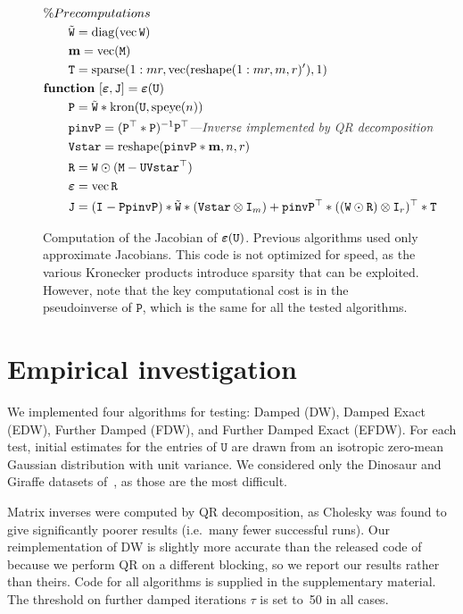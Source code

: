 \documentclass[runningheads]{llncs}
\def\tr{^\top}
\def\xcomment#1{\textcolor[gray]{.2}{\text{\em---#1}}}
\def\vec{\operatorname{vec}}
\def\hadamard{\odot}
\def\m#1{\ensuremath{\mathtt{#1}}}
\def\v#1{\ensuremath{\mathbf{#1}}}
\def\mU{\m U}
\def\mW{\m W}
\def\mM{\m M}
\def\twiddle#1{{\tilde{#1}}}
\def\tW{\twiddle\mW}
\begin{document}
\begin{figure}[t]
\begin{align*}
\MoveEqLeft\% Precomputations\\
&\tW = \operatorname{diag}(\vec \mW)\\
&\v m = \vec(\mM)\\
&\Ttrans = \operatorname{sparse}(1:mr, \vec(\operatorname{reshape}(1:mr, m, r)'), 1)\\
\MoveEqLeft\text{\bf function}~[\verru, \m J] = \verru(\m U)\\
&\m P = \tW * \text{kron}(\mU, \text{speye}(n))\\
&\m {pinvP} = (\m P\tr*\m P)^{-1} \m P\tr \xcomment{Inverse implemented by QR decomposition}\\
&\m {Vstar} = \operatorname{reshape}(\m {pinvP} * \v m, n, r)\\
&\m R = \mW\hadamard(\m M - \mU{\m{Vstar}}\tr)\\
&\verru = \vec{\m R}\\
&\m J = (\Id{} - \m P \m {pinvP})*\tW* (\kron{\m{Vstar}}{\Id m})  +
      \m {pinvP}\tr*(\kron{(\mW\hadamard\m R)}{\Id r})\tr*\Ttrans
\end{align*}
\caption{Computation of the Jacobian of $\verru(\mU)$.   Previous algorithms used only approximate Jacobians.  This code is not optimized for speed, as the various Kronecker products introduce sparsity that can be exploited.  However, note that the key computational cost is in the pseudoinverse of $\m P$, which is the same for all the tested algorithms.}
\label{fig:computeJ}
\end{figure}

\section{Empirical investigation}
We implemented four algorithms for testing: Damped (DW), Damped Exact (EDW), Further Damped (FDW), and Further Damped Exact (EFDW).   For each test, initial estimates for the entries of $\mU$ are drawn from an isotropic zero-mean Gaussian distribution with unit variance.   We considered only the Dinosaur and Giraffe datasets of~\cite{buchanan2005damped}, as those are the most difficult.

Matrix inverses were computed by QR decomposition, as Cholesky was found to give significantly poorer results (i.e.\ many fewer successful runs).  Our reimplementation of DW is slightly more accurate than the released code of~\cite{okatani2011efficient} because we perform QR on a different blocking, so we report our results rather than theirs.
Code for all algorithms is supplied in the supplementary material.  The threshold on further damped iterations $\tau$ is set to~50 in all cases.
\end{document}
